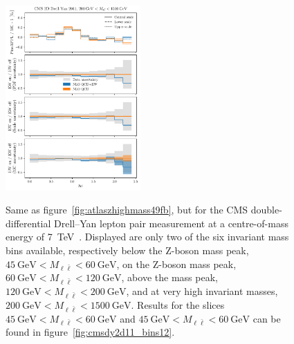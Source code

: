 \begin{figure}[!p]
    \includegraphics[width=0.46\textwidth]{figures/pineappl_CMSDY2D11_bin6}\\
    \caption{Same as figure~\ref{fig:atlaszhighmass49fb}, but for the CMS
      double-differential Drell--Yan lepton pair measurement at a
      centre-of-mass energy of \SI{7}{\tera\electronvolt}~\cite{Chatrchyan:2013tia}. Displayed are
      only two of the six invariant mass bins available, respectively below the
      Z-boson mass peak, $\SI{45}{\giga\electronvolt}<M_{\ell\bar\ell}<\SI{60}{\giga\electronvolt}$, on the Z-boson mass
      peak, $\SI{60}{\giga\electronvolt}<M_{\ell\bar\ell}<\SI{120}{\giga\electronvolt}$, above the mass peak,
      $\SI{120}{\giga\electronvolt}<M_{\ell\bar\ell}<\SI{200}{\giga\electronvolt}$, and at very high invariant masses,
      $\SI{200}{\giga\electronvolt}<M_{\ell\bar\ell}<\SI{1500}{\giga\electronvolt}$.
      Results for the slices $\SI{45}{\giga\electronvolt}<M_{\ell\bar\ell}<\SI{60}{\giga\electronvolt}$ and $\SI{45}{\giga\electronvolt}<M_{\ell\bar\ell}<\SI{60}{\giga\electronvolt}$ can be found in figure~\ref{fig:cmsdy2d11_bins12}.}
    \label{fig:cmsdy2d11_bins3456}
\end{figure}

